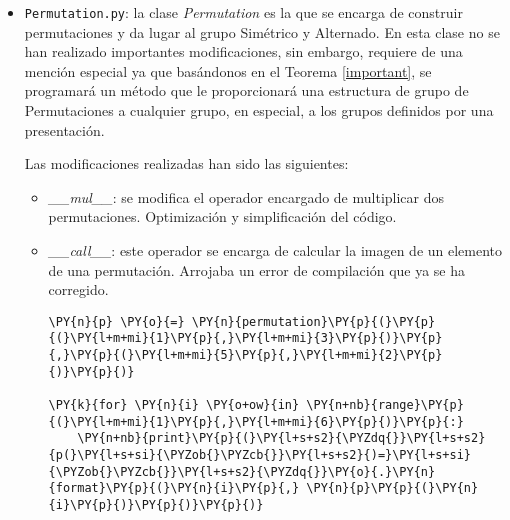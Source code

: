 \begin{itemize}
\begin{itemize}
            \begin{tcolorbox}[breakable, size=fbox, boxrule=.5pt, pad at break*=1mm, opacityfill=0]
\begin{Verbatim}[commandchars=\\\{\}]
(0, ())
\end{Verbatim}
\end{tcolorbox}
        
   \item  \textit{cosets}: método que calcula las clases laterales de un grupo
$G$ sobre un subgrupo $H$. Se optimiza y se simplifica.

\end{itemize}

\item   \texttt{Permutation.py}: la clase \textit{Permutation} es la
  que se encarga de construir permutaciones y da lugar al grupo
  Simétrico y Alternado. En esta clase no se han realizado importantes
  modificaciones, sin embargo, requiere de una mención especial ya que
  basándonos en el Teorema \ref{important}, se programará un
  método que le proporcionará una estructura de grupo de Permutaciones a
  cualquier grupo, en especial, a los grupos definidos por una
  presentación.

  Las modificaciones realizadas han sido las siguientes:
  \begin{itemize}
    \item \textit{\_\_mul\_\_}: se modifica el operador encargado de
  multiplicar dos permutaciones. Optimización y simplificación del
  código.
    \item \textit{\_\_call\_\_}: este operador se encarga de calcular la
  imagen de un elemento de una permutación. Arrojaba un error de
  compilación que ya se ha corregido.


    \begin{tcolorbox}[breakable, size=fbox, boxrule=1pt, pad at break*=1mm,colback=cellbackground, colframe=cellborder]
\begin{Verbatim}[commandchars=\\\{\}]
\PY{n}{p} \PY{o}{=} \PY{n}{permutation}\PY{p}{(}\PY{p}{(}\PY{l+m+mi}{1}\PY{p}{,}\PY{l+m+mi}{3}\PY{p}{)}\PY{p}{,}\PY{p}{(}\PY{l+m+mi}{5}\PY{p}{,}\PY{l+m+mi}{2}\PY{p}{)}\PY{p}{)}

\PY{k}{for} \PY{n}{i} \PY{o+ow}{in} \PY{n+nb}{range}\PY{p}{(}\PY{l+m+mi}{1}\PY{p}{,}\PY{l+m+mi}{6}\PY{p}{)}\PY{p}{:}
    \PY{n+nb}{print}\PY{p}{(}\PY{l+s+s2}{\PYZdq{}}\PY{l+s+s2}{p(}\PY{l+s+si}{\PYZob{}\PYZcb{}}\PY{l+s+s2}{)=}\PY{l+s+si}{\PYZob{}\PYZcb{}}\PY{l+s+s2}{\PYZdq{}}\PY{o}{.}\PY{n}{format}\PY{p}{(}\PY{n}{i}\PY{p}{,} \PY{n}{p}\PY{p}{(}\PY{n}{i}\PY{p}{)}\PY{p}{)}\PY{p}{)}
\end{Verbatim}
\end{tcolorbox}


\end{itemize}
\end{itemize}
